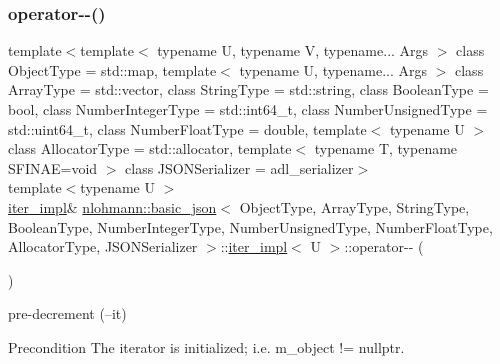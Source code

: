 \subsubsection{\texorpdfstring{operator-\/-\/()}{operator--()}\hspace{0.1cm}{\footnotesize\ttfamily [2/2]}}
{\footnotesize\ttfamily template$<$template$<$ typename U, typename V, typename... Args $>$ class Object\+Type = std\+::map, template$<$ typename U, typename... Args $>$ class Array\+Type = std\+::vector, class String\+Type  = std\+::string, class Boolean\+Type  = bool, class Number\+Integer\+Type  = std\+::int64\+\_\+t, class Number\+Unsigned\+Type  = std\+::uint64\+\_\+t, class Number\+Float\+Type  = double, template$<$ typename U $>$ class Allocator\+Type = std\+::allocator, template$<$ typename T, typename S\+F\+I\+N\+A\+E=void $>$ class J\+S\+O\+N\+Serializer = adl\+\_\+serializer$>$ \\
template$<$typename U $>$ \\
\mbox{\hyperlink{classnlohmann_1_1basic__json_1_1iter__impl}{iter\+\_\+impl}}\& \mbox{\hyperlink{classnlohmann_1_1basic__json}{nlohmann\+::basic\+\_\+json}}$<$ Object\+Type, Array\+Type, String\+Type, Boolean\+Type, Number\+Integer\+Type, Number\+Unsigned\+Type, Number\+Float\+Type, Allocator\+Type, J\+S\+O\+N\+Serializer $>$\+::\mbox{\hyperlink{classnlohmann_1_1basic__json_1_1iter__impl}{iter\+\_\+impl}}$<$ U $>$\+::operator-\/-\/ (\begin{DoxyParamCaption}{ }\end{DoxyParamCaption})\hspace{0.3cm}{\ttfamily [inline]}}



pre-\/decrement (--it) 

\begin{DoxyPrecond}{Precondition}
The iterator is initialized; i.\+e. {\ttfamily m\+\_\+object != nullptr}. 
\end{DoxyPrecond}
\mbox{\label{classnlohmann_1_1basic__json_1_1iter__impl_a9fd84e884e8474c000dc966d331a4854}} 
